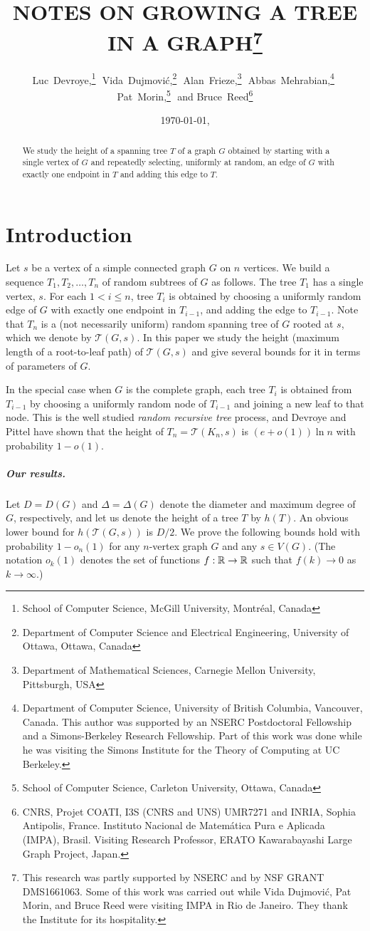 \documentclass{patmorin}
\date{\today, \currenttime}
\title{\MakeUppercase{Notes on Growing a Tree in a Graph}\thanks{%
This research was partly supported by NSERC and by NSF GRANT DMS1661063.
Some of this work was carried out while Vida Dujmovi\'c, Pat Morin, and
Bruce Reed were visiting IMPA in Rio de Janeiro. They thank the Institute
for its hospitality. }}
\author{
   Luc~Devroye,\thanks{School of Computer Science, McGill University, Montr\'eal, Canada}\,\,
   Vida~Dujmovi\'c,\thanks{Department of Computer Science and Electrical Engineering, University of Ottawa, Ottawa, Canada}\,\,
   Alan~Frieze,\thanks{Department of Mathematical Sciences, Carnegie Mellon University, Pittsburgh, USA}\,\,
   Abbas~Mehrabian,\thanks{Department of Computer Science, University of British Columbia, Vancouver, Canada. 
   This author was
       supported by an NSERC Postdoctoral Fellowship and a Simons-Berkeley
       Research Fellowship. Part of this work was done while he was
       visiting the Simons Institute for the Theory of Computing at UC
       Berkeley.}\,\,
   Pat~Morin,\thanks{School of Computer Science, Carleton University, Ottawa, Canada}\,\, and
   Bruce~Reed\thanks{CNRS, Projet COATI, I3S (CNRS and UNS) UMR7271 and INRIA, Sophia Antipolis, France. Instituto Nacional de Matem\'atica Pura e Aplicada (IMPA), Brasil. Visiting
Research Professor, ERATO Kawarabayashi Large Graph Project, Japan.}
}
\newcommand{\tcal}{\mathcal{T}}
\begin{document}
\maketitle

\begin{abstract}
We study the height of a spanning tree $T$ of a graph $G$ obtained by
starting with a single vertex of $G$ and repeatedly selecting, uniformly
at random, an edge of $G$ with exactly one endpoint in $T$ and adding
this edge to $T$.
\end{abstract}

\newpage 
\tableofcontents
\newpage

\section{Introduction}
Let $s$ be a vertex of a simple connected graph $G$ on $n$ vertices.
We build a sequence $T_1,T_2,\dots,T_n$ of random subtrees of $G$ as follows.
The tree $T_1$ has a single vertex, $s$.
For each $1<i\leq n$, tree $T_i$ is obtained by choosing
a uniformly random edge of $G$ with exactly one endpoint in $T_{i-1}$,
and adding the edge to $T_{i-1}$.
Note that $T_n$ is a (not necessarily uniform) random spanning tree of $G$ rooted at $s$, which we denote by $\tcal(G,s)$.
In this paper we study the height (maximum length of a root-to-leaf path) of $\tcal(G,s)$ and give several bounds for it in terms of parameters of $G$.

In the special case when $G$ is the complete graph, 
each tree $T_i$ is obtained from $T_{i-1}$ by choosing a uniformly random node of $T_{i-1}$ and joining a new leaf to that node.
This is the well studied \emph{random recursive tree} process,
and 
Devroye \cite{devroye:branching} and Pittel \cite{pittel:note} have
shown that the height of $T_n=\tcal(K_n,s)$ is
$(e+o(1))\ln n$ with probability $1-o(1)$.


\subparagraph{Our results.}
Let $D=D(G)$ and $\Delta=\Delta(G)$ denote the diameter and maximum degree of $G$, respectively, and let us denote 
the height of a tree $T$ by $h(T)$.
An obvious lower bound for $h(\tcal(G,s))$ is $D/2$.
We prove the following bounds hold with probability $1-o_n(1)$ for any $n$-vertex graph $G$ and any $s\in V(G)$.
(The notation $o_k(1)$ denotes the set of functions $f:\mathbb{R}\to\mathbb{R}$ such
that $f(k)\to 0$ as $k\to\infty$.)
\end{document}
